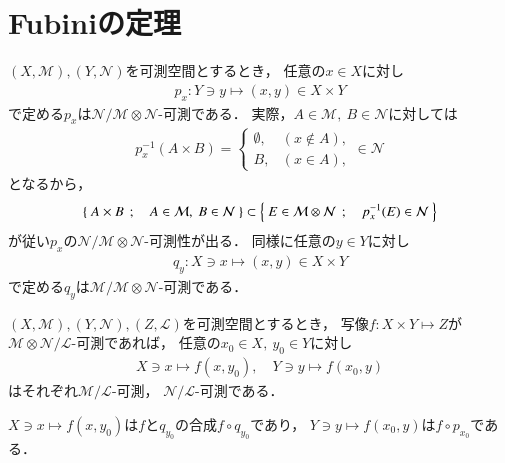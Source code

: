 \section{Fubiniの定理}
	$(X,\mathcal{M}),(Y,\mathcal{N})$を可測空間とするとき，
	任意の$x \in X$に対し
	\begin{align}
		p_x:Y \ni y \longmapsto (x,y) \in X \times Y
	\end{align}
	で定める$p_x$は$\mathcal{N}/\mathcal{M} \otimes \mathcal{N}$-可測である．
	実際，$A \in \mathcal{M},\ B \in \mathcal{N}$に対しては
	\begin{align}
		p_x^{-1}(A \times B) = 
		\begin{cases}
			\emptyset, & (x \notin A), \\
			B, & (x \in A),
		\end{cases}
		\in \mathcal{N}
	\end{align}
	となるから，
	\begin{align}
		\left\{\ A \times B\ \, ; \quad A \in \mathcal{M},\ B \in \mathcal{N}\ \right\}
		\subset \left\{\ E \in \mathcal{M} \otimes \mathcal{N}\ \, ; \quad p_x^{-1}(E) \in \mathcal{N}\ \right\}
	\end{align}
	が従い$p_x$の$\mathcal{N}/\mathcal{M} \otimes \mathcal{N}$-可測性が出る．
	同様に任意の$y \in Y$に対し
	\begin{align}
		q_y:X \ni x \longmapsto (x,y) \in X \times Y
	\end{align}
	で定める$q_y$は$\mathcal{M}/\mathcal{M} \otimes \mathcal{N}$-可測である．
	
	\begin{screen}
		\begin{lem}[二変数可測写像は片変数で可測]\label{lem:Fubini_lemma_1}
			$(X,\mathcal{M}),(Y,\mathcal{N}),(Z,\mathcal{L})$を可測空間とするとき，
			写像$f: X \times Y \longmapsto Z$が
			$\mathcal{M}\otimes \mathcal{N}/ \mathcal{L}$-可測であれば，
			任意の$x_0 \in X,\ y_0 \in Y$に対し
			\begin{align}
				X \ni x \longmapsto f(x,y_0),
				\quad Y \ni y \longmapsto f(x_0,y)
			\end{align}
			はそれぞれ$\mathcal{M}/\mathcal{L}$-可測，
			$\mathcal{N}/\mathcal{L}$-可測である．
		\end{lem}
	\end{screen}
	
	\begin{prf}
		$X \ni x \longmapsto f(x,y_0)$は$f$と$q_{y_0}$の合成$f \circ q_{y_0}$であり，
		$Y \ni y \longmapsto f(x_0,y)$は$f \circ p_{x_0}$である．
		\QED
	\end{prf}
	
